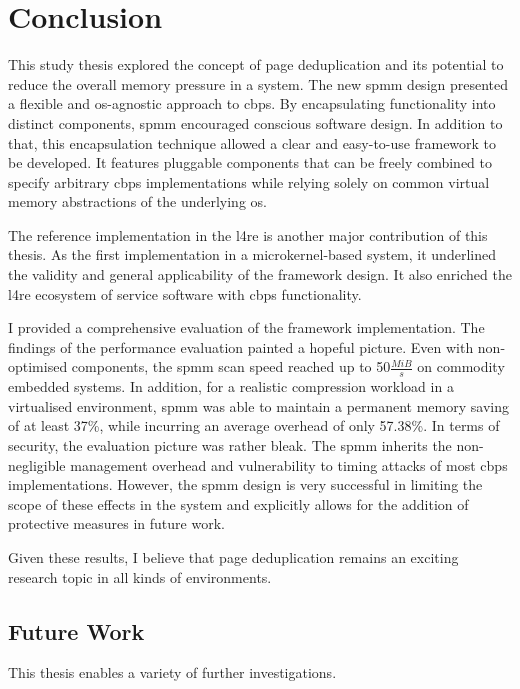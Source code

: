 \chapter{Conclusion}
\label{chap:conclusion}

This study thesis explored the concept of page deduplication and its potential to reduce the overall memory pressure in a system.
The new \ac{spmm} design presented a flexible and \ac{os}-agnostic approach to \acl{cbps}.
By encapsulating functionality into distinct components, \ac{spmm} encouraged conscious software design.
In addition to that, this encapsulation technique allowed a clear and easy-to-use framework to be developed.
It features pluggable components that can be freely combined to specify arbitrary \ac{cbps} implementations while relying solely on common virtual memory abstractions of the underlying \ac{os}.

The reference implementation in the \acl{l4re} is another major contribution of this thesis.
As the first implementation in a microkernel-based system, it underlined the validity and general applicability of the framework design.
It also enriched the \ac{l4re} ecosystem of service software with \ac{cbps} functionality.

I provided a comprehensive evaluation of the framework implementation.
The findings of the performance evaluation painted a hopeful picture.
Even with non-optimised components, the \ac{spmm} scan speed reached up to 50$\frac{MiB}{s}$ on commodity embedded systems.
In addition, for a realistic compression workload in a virtualised environment, \ac{spmm} was able to maintain a permanent memory saving of at least 37\%, while incurring an average overhead of only 57.38\%.
In terms of security, the evaluation picture was rather bleak.
The \ac{spmm} inherits the non-negligible management overhead and vulnerability to timing attacks of most \ac{cbps} implementations.
However, the \ac{spmm} design is very successful in limiting the scope of these effects in the system and explicitly allows for the addition of protective measures in future work.

Given these results, I believe that page deduplication remains an exciting research topic in all kinds of environments.

\section{Future Work}
\label{sec:future-work}

This thesis enables a variety of further investigations.

